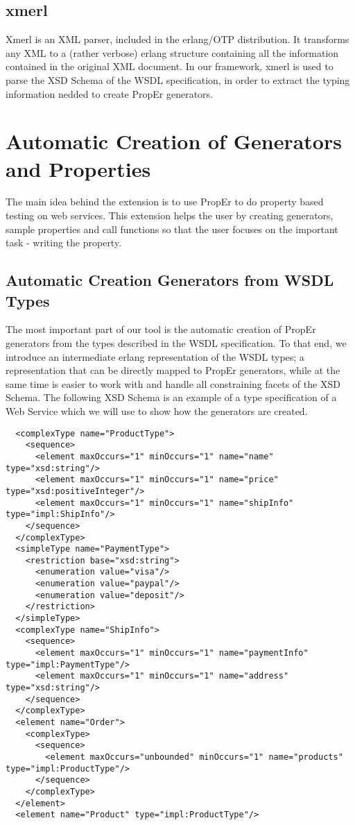 \documentclass[submission,copyright,a4]{eptcs}
\begin{document}
\subsection{xmerl}

Xmerl is an XML parser, included in the erlang/OTP distribution. It transforms any XML to a (rather verbose) erlang structure containing all the information contained in the original XML document. In our framework, xmerl is used to parse the XSD Schema of the WSDL specification, in order to extract the typing information nedded to create PropEr generators.

\section{Automatic Creation of Generators and Properties}

The main idea behind the extension is to use PropEr to do property based testing on web services. This extension helps the user by creating generators, sample properties and call functions so that the user focuses on the important task - writing the property. 

\subsection{Automatic Creation Generators from WSDL Types}

The most important part of our tool is the automatic creation of PropEr generators from the types described in the WSDL specification. To that end, we introduce an intermediate erlang representation of the WSDL types; a representation that can be directly mapped to PropEr generators, while at the same time is easier to work with and handle all constraining facets of the XSD Schema. The following XSD Schema is an example of a type specification of a Web Service which we will use to show how the generators are created.

\begin{lstlisting}
  <complexType name="ProductType">
    <sequence>
      <element maxOccurs="1" minOccurs="1" name="name" type="xsd:string"/>
      <element maxOccurs="1" minOccurs="1" name="price" type="xsd:positiveInteger"/>
      <element maxOccurs="1" minOccurs="1" name="shipInfo" type="impl:ShipInfo"/>
    </sequence>
  </complexType>
  <simpleType name="PaymentType">
    <restriction base="xsd:string">
      <enumeration value="visa"/>
      <enumeration value="paypal"/>
      <enumeration value="deposit"/>
    </restriction>
  </simpleType>
  <complexType name="ShipInfo">
    <sequence>
      <element maxOccurs="1" minOccurs="1" name="paymentInfo" type="impl:PaymentType"/>
      <element maxOccurs="1" minOccurs="1" name="address" type="xsd:string"/>
    </sequence>
  </complexType>
  <element name="Order">
    <complexType>
      <sequence>
        <element maxOccurs="unbounded" minOccurs="1" name="products" type="impl:ProductType"/>
      </sequence>
    </complexType>
  </element>
  <element name="Product" type="impl:ProductType"/>
\end{lstlisting}
\end{document}
